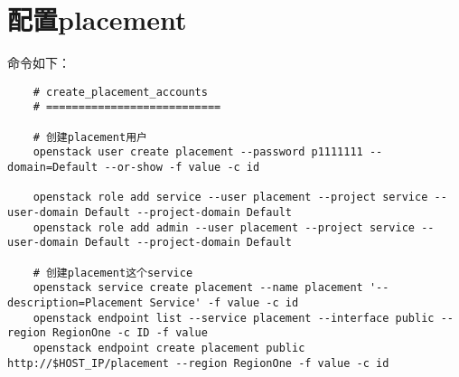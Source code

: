 \documentclass[a4paper,left=1.5cm,right=1.5cm,11pt]{article}
\begin{document}
\section{配置placement}
	命令如下：
	\begin{lstlisting}
	# create_placement_accounts
	# ===========================

	# 创建placement用户
	openstack user create placement --password p1111111 --domain=Default --or-show -f value -c id
	
	openstack role add service --user placement --project service --user-domain Default --project-domain Default
	openstack role add admin --user placement --project service --user-domain Default --project-domain Default

	# 创建placement这个service
	openstack service create placement --name placement '--description=Placement Service' -f value -c id
	openstack endpoint list --service placement --interface public --region RegionOne -c ID -f value
	openstack endpoint create placement public http://$HOST_IP/placement --region RegionOne -f value -c id
	\end{lstlisting}
\end{document}

